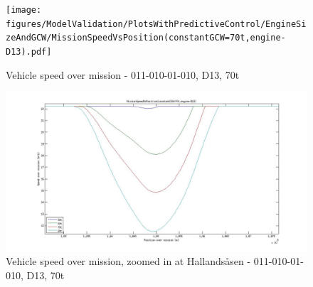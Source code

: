 \documentclass[ExampleMasters.tex]{subfiles}
\begin{document}
\begin{figure}[h!]
\centering
\texttt{[image: figures/ModelValidation/PlotsWithPredictiveControl/EngineSizeAndGCW/MissionSpeedVsPosition(constantGCW=70t,engine-D13).pdf]}
\caption{Vehicle speed over mission - 011-010-01-010, D13, 70t}
\label{speedEngineDownsizingPredictiveSoC}
\end{figure}
\begin{figure}[h!]
\centering
\includegraphics[width=\linewidth]{figures/ModelValidation/PlotsWithPredictiveControl/EngineSizeAndGCW/MissionSpeedZoomedInD13.jpg}
\caption{Vehicle speed over mission, zoomed in at Hallands\aa sen - 011-010-01-010, D13, 70t}
\label{speedZoomedEngineDownsizingPredictiveSoC}
\end{figure}
\end{document}
